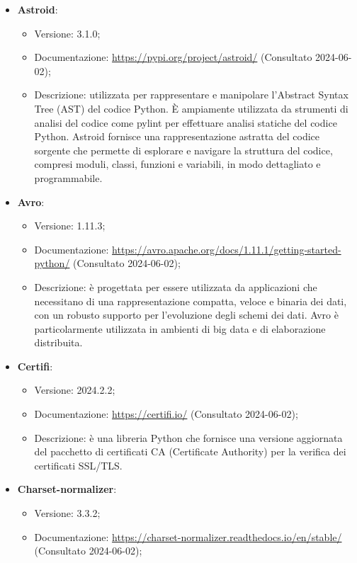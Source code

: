 \begin{itemize}
    \item \textbf{Astroid}:
    \begin{itemize}
        \item Versione: 3.1.0;
        \item Documentazione: \url{https://pypi.org/project/astroid/} (Consultato 2024-06-02);
        \item Descrizione: utilizzata per rappresentare e manipolare l'Abstract Syntax Tree (AST) del codice Python. È ampiamente utilizzata da strumenti di analisi del codice come pylint per effettuare analisi statiche del codice Python. Astroid fornisce una rappresentazione astratta del codice sorgente che permette di esplorare e navigare la struttura del codice, compresi moduli, classi, funzioni e variabili, in modo dettagliato e programmabile.
    \end{itemize}
    \item \textbf{Avro}:
    \begin{itemize}
        \item Versione: 1.11.3;
        \item Documentazione: \url{https://avro.apache.org/docs/1.11.1/getting-started-python/} (Consultato 2024-06-02);
        \item Descrizione: è progettata per essere utilizzata da applicazioni che necessitano di una rappresentazione compatta, veloce e binaria dei dati, con un robusto supporto per l'evoluzione degli schemi dei dati. Avro è particolarmente utilizzata in ambienti di big data e di elaborazione distribuita.
    \end{itemize}
    \item \textbf{Certifi}:
    \begin{itemize}
        \item Versione: 2024.2.2;
        \item Documentazione: \url{https://certifi.io/} (Consultato 2024-06-02);
        \item Descrizione: è una libreria Python che fornisce una versione aggiornata del pacchetto di certificati CA (Certificate Authority) per la verifica dei certificati SSL/TLS.
    \end{itemize}
    \item \textbf{Charset-normalizer}:
    \begin{itemize}
        \item Versione: 3.3.2;
        \item Documentazione: \url{https://charset-normalizer.readthedocs.io/en/stable/} (Consultato 2024-06-02);

\end{itemize}
\end{itemize}
